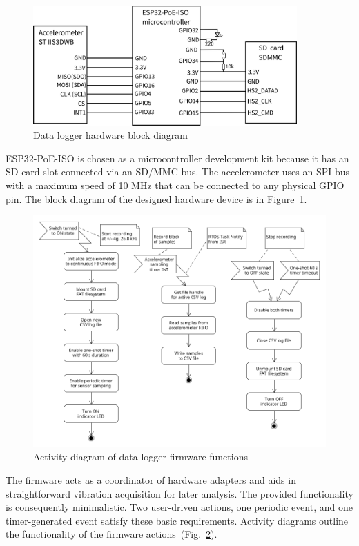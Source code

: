 \begin{figure}[h]
	\centering
	\includegraphics[width=0.9\textwidth]{assets/design/hw-block-schematic.png}
	\caption{Data logger hardware block diagram}
	\label{fig:design:block-diagram-hw}
\end{figure} 

ESP32-PoE-ISO is chosen as a microcontroller development kit because it has an SD card slot connected via an SD/MMC bus. The accelerometer uses an SPI bus with a maximum speed of 10 MHz that can be connected to any physical GPIO pin. The block diagram of the designed hardware device is in Figure~\ref{fig:design:block-diagram-hw}.

\begin{figure}[h]
    \centering
	\includegraphics[width=\textwidth]{assets/design/firmware-design.png}
	\caption{Activity diagram of data logger firmware functions}
	\label{fig:design:firmware-activity}
\end{figure}

The firmware acts as a coordinator of hardware adapters and aids in straightforward vibration acquisition for later analysis. The provided functionality is consequently minimalistic. Two user-driven actions, one periodic event, and one timer-generated event satisfy these basic requirements. Activity diagrams outline the functionality of the firmware actions~(Fig.~\ref{fig:design:firmware-activity}).

